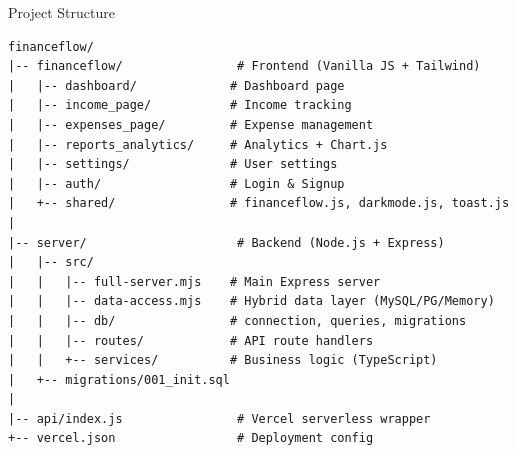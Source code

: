 \documentclass[aspectratio=169, 12pt]{beamer}
\begin{document}
\begin{frame}[fragile]{Project Structure}
\scriptsize
\begin{lstlisting}
financeflow/
|-- financeflow/                # Frontend (Vanilla JS + Tailwind)
|   |-- dashboard/             # Dashboard page
|   |-- income_page/           # Income tracking
|   |-- expenses_page/         # Expense management
|   |-- reports_analytics/     # Analytics + Chart.js
|   |-- settings/              # User settings
|   |-- auth/                  # Login & Signup
|   +-- shared/                # financeflow.js, darkmode.js, toast.js
|
|-- server/                     # Backend (Node.js + Express)
|   |-- src/
|   |   |-- full-server.mjs    # Main Express server
|   |   |-- data-access.mjs    # Hybrid data layer (MySQL/PG/Memory)
|   |   |-- db/                # connection, queries, migrations
|   |   |-- routes/            # API route handlers
|   |   +-- services/          # Business logic (TypeScript)
|   +-- migrations/001_init.sql
|
|-- api/index.js                # Vercel serverless wrapper
+-- vercel.json                 # Deployment config
\end{lstlisting}
\end{frame}
\end{document}
